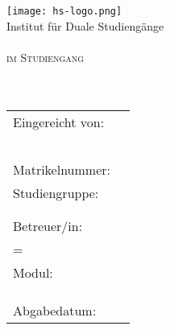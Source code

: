 
\begin{titlepage}

	\begin{center}
		\texttt{[image: hs-logo.png]}\\
		\large{Institut für Duale Studiengänge}\\[4ex]
		
		\large{\scshape \betreff}\\
		\large{\scshape im Studiengang \studiengang}\\[10ex]
		
		
		\huge{\textbf{\titel}}\\[1.5ex]
		\Large{\textbf{\untertitel}}\\[10ex]
	\end{center}
	
	\begin{tabular} { p{7.5cm} l }
		Eingereicht von: & \autorName \\
		& \autorGeburt \\
		\\
		& \autorAnschrift \\
		& \autorOrt \\
		\\
		Matrikelnummer: & \autorMatrikel \\
		Studiengruppe: & \autorStudiengruppe \\
		\\\\
		Betreuer/in: & \betreuer \\
		\if\zweitBetreuer={}\else & \zweitBetreuer \\ \fi
		Modul: & \modul \\
		\\\\\\
		Abgabedatum: & \abgabeTermin \\
	\end{tabular}


\end{titlepage}